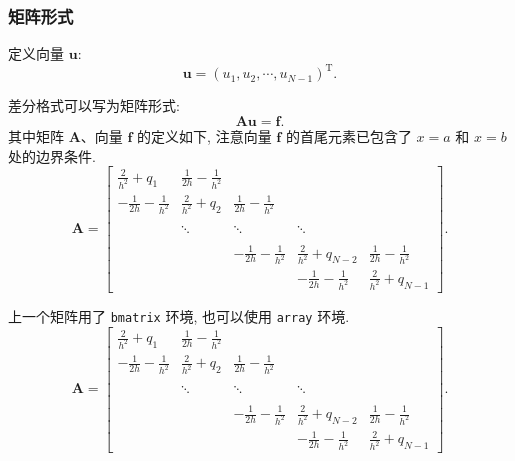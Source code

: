 \documentclass[12pt,final]{article}
\numberwithin{equation}{section}
\numberwithin{figure}{section}
\numberwithin{table}{section}
\theoremstyle{plain}
\begin{document}
\subsubsection{矩阵形式}

定义向量 $\boldsymbol{u}$:
\begin{equation*}
  \boldsymbol{u}=(u_{1}, u_{2}, \cdots, u_{N-1})^{\mathrm{T}}.
\end{equation*}

差分格式可以写为矩阵形式:
\begin{equation*}
  \boldsymbol{A}\boldsymbol{u}=\boldsymbol{f}.
\end{equation*}
其中矩阵 $\boldsymbol{A}$、向量 $\boldsymbol{f}$ 的定义如下, 注意向量 $\boldsymbol{f}$ 的首尾元素已包含了 $x=a$ 和 $x=b$ 处的边界条件.
\begin{equation}\label{eq:matrix1}
\boldsymbol{A}=\begin{bmatrix}
\frac{2}{h^{2}}+q_{1} & \frac{1}{2h}-\frac{1}{h^{2}} &   &  &  \\[8pt]
 -\frac{1}{2h}-\frac{1}{h^{2}} & \frac{2}{h^{2}}+q_{2} & \frac{1}{2h}-\frac{1}{h^{2}}  & &  \\[8pt]
  &  &  &  &    \\
  &  \ddots  & \ddots  &  \ddots  &  \\[8pt]
  &  &  &  &    \\
  &   & -\frac{1}{2h}-\frac{1}{h^{2}} & \frac{2}{h^{2}}+q_{N-2}& \frac{1}{2h}-\frac{1}{h^{2}} \\[8pt]
  &  &  & -\frac{1}{2h}-\frac{1}{h^{2}} & \frac{2}{h^{2}}+q_{N-1}
\end{bmatrix}.
\end{equation}

上一个矩阵用了 \verb|bmatrix| 环境, 也可以使用 \verb|array| 环境.
\begin{equation}\label{eq:matrix2}
\boldsymbol{A}=\left[\begin{array}{cccccc}
\frac{2}{h^{2}}+q_{1} & \frac{1}{2h}-\frac{1}{h^{2}} &  &  &  \\[8pt]
 -\frac{1}{2h}-\frac{1}{h^{2}} & \frac{2}{h^{2}}+q_{2} & \frac{1}{2h}-\frac{1}{h^{2}}  & &  \\[8pt]
  &  &  &  &   \\
  &  \ddots  & \ddots & \ddots &  \\[8pt]
  &  &  &  &   \\
  &   & -\frac{1}{2h}-\frac{1}{h^{2}} & \frac{2}{h^{2}}+q_{N-2} & \frac{1}{2h}-\frac{1}{h^{2}} \\[8pt]
  &  &  & -\frac{1}{2h}-\frac{1}{h^{2}} & \frac{2}{h^{2}}+q_{N-1}
\end{array}\right].
\end{equation}
\end{document}
